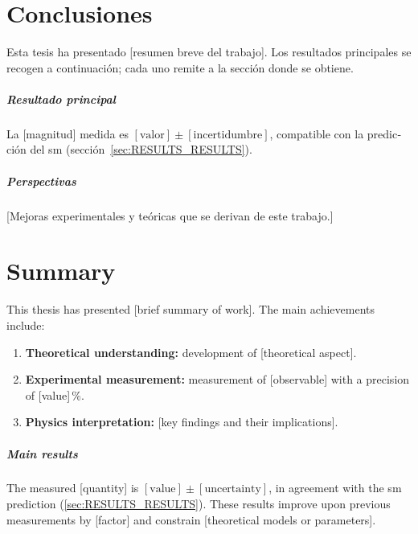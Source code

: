 \documentclass[../../thesis.tex]{subfiles}
\begin{document}
\chapter*{Conclusiones}
\label{sec:SUMMARY_ES}
\begin{otherlanguage}{spanish}\spanishsetup

Esta tesis ha presentado [resumen breve del trabajo]. Los resultados principales se recogen a continuación; cada uno remite a la sección donde se obtiene.

\paragraph{Resultado principal} La [magnitud] medida es $[\text{valor}] \pm [\text{incertidumbre}]$, compatible con la predicción del \gls{sm} (sección~\ref{sec:RESULTS_RESULTS}).

\paragraph{Perspectivas} [Mejoras experimentales y teóricas que se derivan de este trabajo.]

\end{otherlanguage}

\cleardoublepage
\chapter*{Summary}
\label{sec:SUMMARY}

This thesis has presented [brief summary of work]. The main achievements include:

\begin{enumerate}
  \item \textbf{Theoretical understanding:} development of [theoretical aspect].
  \item \textbf{Experimental measurement:} measurement of [observable] with a precision of [value]\,\%.
  \item \textbf{Physics interpretation:} [key findings and their implications].
\end{enumerate}

\paragraph{Main results} The measured [quantity] is $[\text{value}] \pm [\text{uncertainty}]$, in agreement with the \gls{sm} prediction (\cref{sec:RESULTS_RESULTS}). These results improve upon previous measurements by [factor] and constrain [theoretical models or parameters].
\end{document}
